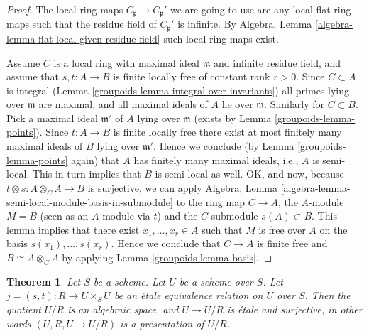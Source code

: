 \documentclass{amsart}
\theoremstyle{plain}
\newtheorem{theorem}[subsection]{Theorem}
\theoremstyle{definition}
\theoremstyle{remark}
\numberwithin{equation}{subsection}
\begin{document}
\begin{proof}
\medskip\noindent
The local ring maps $C_{\mathfrak p} \to C_{\mathfrak p}'$ we are going
to use are any local flat ring maps such that the residue field of
$C_{\mathfrak p}'$ is infinite.
By Algebra, Lemma \ref{algebra-lemma-flat-local-given-residue-field}
such local ring maps exist.

\medskip\noindent
Assume $C$ is a local ring with maximal ideal $\mathfrak m$ and
infinite residue field, and assume that $s, t : A \to B$ is
finite locally free of constant rank $r > 0$.
Since $C \subset A$ is integral (Lemma \ref{groupoids-lemma-integral-over-invariants})
all primes lying over $\mathfrak m$ are maximal, and all maximal
ideals of $A$ lie over $\mathfrak m$. Similarly for $C \subset B$.
Pick a maximal ideal $\mathfrak m'$
of $A$ lying over $\mathfrak m$ (exists by Lemma \ref{groupoids-lemma-points}).
Since $t : A \to B$ is finite locally free there exist at most finitely
many maximal ideals of $B$ lying over $\mathfrak m'$. Hence we conclude
(by Lemma \ref{groupoids-lemma-points} again)
that $A$ has finitely many maximal ideals, i.e.,
$A$ is semi-local. This in turn implies that $B$ is semi-local as
well. OK, and now, because $t \otimes s : A \otimes_C A \to B$ is surjective,
we can apply
Algebra, Lemma \ref{algebra-lemma-semi-local-module-basis-in-submodule}
to the ring map $C \to A$, the $A$-module $M = B$ (seen as an $A$-module
via $t$) and the $C$-submodule $s(A) \subset B$. This lemma implies that there
exist $x_1, \ldots, x_r \in A$ such that $M$ is free over $A$
on the basis $s(x_1), \ldots, s(x_r)$. Hence we conclude that $C \to A$
is finite free and $B \cong A \otimes_C A$ by applying
Lemma \ref{groupoids-lemma-basis}.
\end{proof}


\begin{theorem}
\label{spaces-theorem-presentation}
Let $S$ be a scheme. Let $U$ be a scheme over $S$.
Let $j = (s, t) : R \to U \times_S U$
be an \'etale equivalence relation on $U$ over $S$.
Then the quotient $U/R$ is an algebraic space,
and $U \to U/R$ is \'etale and surjective, in other words
$(U, R, U \to U/R)$ is a presentation of $U/R$.
\end{theorem}
\end{document}

